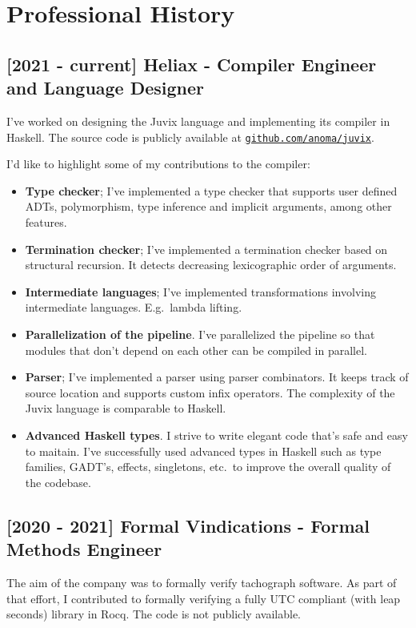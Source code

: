 \documentclass[11pt]{article}
\begin{document}
\section{Professional History}

\subsection*{[2021 - current] Heliax - Compiler Engineer and Language Designer}
I've worked on designing the Juvix language and implementing its compiler in Haskell.
The source code is publicly available at \href{https://github.com/anoma/juvix}{\texttt{github.com/anoma/juvix}}.

I'd like to highlight some of my contributions to the compiler:
\begin{itemize}
  \item \textbf{Type checker}; I've implemented a type checker that supports
        user defined ADTs, polymorphism, type inference and implicit arguments,
        among other features.
  \item \textbf{Termination checker}; I've implemented a termination checker based on
        structural recursion. It detects decreasing lexicographic order of
        arguments.
  \item \textbf{Intermediate languages}; I've implemented transformations
        involving intermediate languages. E.g.\ lambda lifting.
  \item \textbf{Parallelization of the pipeline}. I've parallelized the pipeline so that
        modules that don't depend on each other can be compiled in parallel.
  \item \textbf{Parser}; I've implemented a parser using parser combinators. It keeps track of source location and supports custom infix operators. The complexity of the Juvix language is comparable to Haskell.
  \item \textbf{Advanced Haskell types}. I strive to write elegant code that's
        safe and easy to maitain. I've successfully used advanced types in
        Haskell such as type families, GADT's, effects, singletons, etc.\ to
        improve the overall quality of the codebase.
\end{itemize}

\subsection*{[2020 - 2021] Formal Vindications - Formal Methods Engineer}
The aim of the company was to formally verify tachograph software. As part of
that effort, I contributed to formally verifying a fully UTC compliant (with
leap seconds) library in Rocq. The code is not publicly available.
\end{document}
